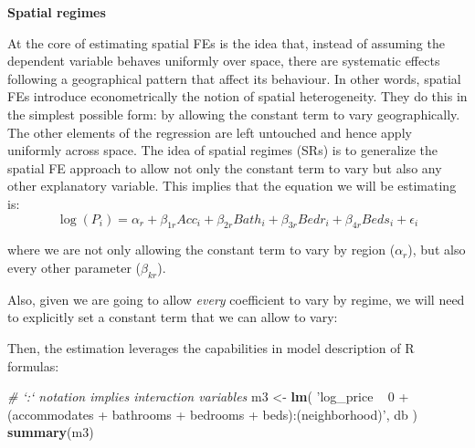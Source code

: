 \documentclass[
]{book}
\newenvironment{Shaded}{\begin{snugshade}}{\end{snugshade}}
\newcommand{\CommentTok}[1]{\textcolor[rgb]{0.56,0.35,0.01}{\textit{#1}}}
\newcommand{\DecValTok}[1]{\textcolor[rgb]{0.00,0.00,0.81}{#1}}
\newcommand{\KeywordTok}[1]{\textcolor[rgb]{0.13,0.29,0.53}{\textbf{#1}}}
\newcommand{\NormalTok}[1]{#1}
\newcommand{\OperatorTok}[1]{\textcolor[rgb]{0.81,0.36,0.00}{\textbf{#1}}}
\newcommand{\StringTok}[1]{\textcolor[rgb]{0.31,0.60,0.02}{#1}}
\begin{document}
\textbf{Spatial regimes}

At the core of estimating spatial FEs is the idea that, instead of assuming the dependent variable behaves uniformly over space, there are systematic effects following a geographical pattern that affect its behaviour. In other words, spatial FEs introduce econometrically the notion of spatial heterogeneity. They do this in the simplest possible form: by allowing the constant term to vary geographically. The other elements of the regression are left untouched and hence apply uniformly across space. The idea of spatial regimes (SRs) is to generalize the spatial FE approach to allow not only the constant term to vary but also any other explanatory variable. This implies that the equation we will be estimating is:
\[
\log(P_i) = \alpha_r + \beta_{1r} Acc_i + \beta_{2r} Bath_i + \beta_{3r} Bedr_i + \beta_{4r} Beds_i + \epsilon_i
\]

where we are not only allowing the constant term to vary by region (\(\alpha_r\)), but also every other parameter (\(\beta_{kr}\)).

Also, given we are going to allow \emph{every} coefficient to vary by regime, we will need to explicitly set a constant term that we can allow to vary:

\begin{Shaded}
\end{Shaded}

Then, the estimation leverages the capabilities in model description of R formulas:

\begin{Shaded}
\begin{Highlighting}[]
\CommentTok{# `:` notation implies interaction variables}
\NormalTok{m3 <-}\StringTok{ }\KeywordTok{lm}\NormalTok{(}
  \StringTok{'log_price ~ 0 + (accommodates + bathrooms + bedrooms + beds):(neighborhood)'}\NormalTok{, }
\NormalTok{  db}
\NormalTok{)}
\KeywordTok{summary}\NormalTok{(m3)}
\end{Highlighting}
\end{Shaded}
\end{document}
